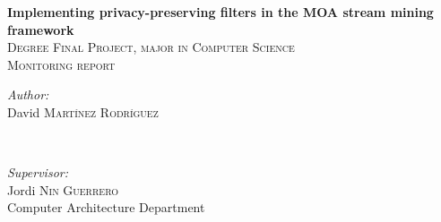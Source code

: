 \begin{titlepage}

\newcommand{\HRule}{\rule{\linewidth}{0.5mm}} %

\center %
 


\vspace*{3cm}

{ \huge \bfseries Implementing privacy-preserving filters in the MOA stream mining framework}\\[1cm] %

\textsc{\Large Degree Final Project, major in Computer Science}\\[0.5cm] %
\textsc{\large Monitoring report}\\[3.5cm] %

 

\begin{minipage}{0.4\textwidth}
\begin{flushleft} \large
\emph{Author:}\\
David \textsc{Martínez Rodríguez} %
\end{flushleft}
\end{minipage}
~
\begin{minipage}{0.5\textwidth}
\begin{flushright} \large
\emph{Supervisor:} \\
Jordi \textsc{Nin Guerrero}\\ %
\small Computer Architecture Department
\end{flushright}
\end{minipage}\\[5.5cm]


\end{titlepage}
